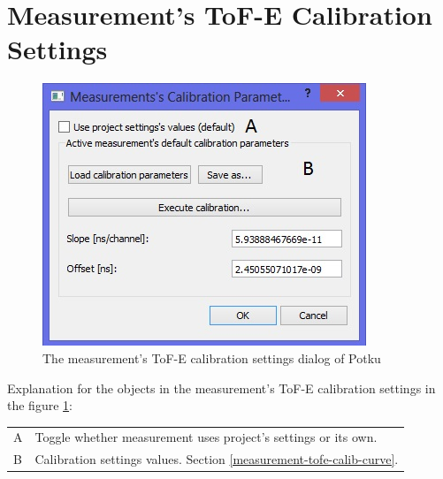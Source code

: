 \documentclass{scrreprt}
\begin{document}
\section{Measurement's ToF-E Calibration Settings}\label{measurement-calibsettings}
\begin{figure}[H]
\centering
\includegraphics[scale=1]{measurement-calibsettings}
\caption{The measurement's ToF-E calibration settings dialog of Potku}
\label{fig-calibsettings}
\end{figure}
Explanation for the objects in the measurement's ToF-E calibration settings in the figure \ref{fig-calibsettings}:

\begin{tabular}{ll}
A & Toggle whether measurement uses project's settings or its own.\\
B & Calibration settings values. Section \ref{measurement-tofe-calib-curve}.\\
\end{tabular}

\end{document}
